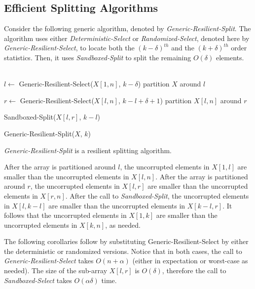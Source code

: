 \documentclass{llncs}
\begin{document}
\subsection{Efficient Splitting Algorithms}
\label{generic_splitting_algorithms}

Consider the following generic algorithm, denoted by \emph{Generic-Resilient-Split}. The algorithm uses either \emph{Deterministic-Select} or \emph{Randomized-Select}, denoted here by \emph{Generic-Resilient-Select}, to locate both the $(k-\delta)^{th}$ and the $(k+\delta)^{th}$ order statistics. Then, it uses \emph{Sandboxed-Split} to split the remaining $O(\delta)$ elements.\\ \ \\

\begin{algorithm}[H]

$l \leftarrow$ Generic-Resilient-Select($X[1, n]$, $k - \delta$)\;
partition $X$ around $l$\;

$r \leftarrow$ Generic-Resilient-Select($X[l, n]$, $k - l + \delta + 1$)\;
partition $X[l, n]$ around $r$\;

Sandboxed-Split($X[l, r]$, $k - l$)\;

\caption{Generic-Resilient-Split($X$, $k$)}
\end{algorithm}
\vspace{0.4cm}

\begin{lemma}
\label{lem:generic_resilient_split_lemma}
\emph{Generic-Resilient-Split} is a resilient splitting algorithm.
\end{lemma}

\begin{pf}
After the array is partitioned around $l$, the uncorrupted elements in $X[1, l]$ are smaller than the uncorrupted elements in $X[l, n]$. After the array is partitioned around $r$, the uncorrupted elements in $X[l, r]$ are smaller than the uncorrupted elements in $X[r, n]$. After the call to \emph{Sandboxed-Split}, the uncorrupted elements in $X[l, k-l]$ are smaller than the uncorrupted elements in $X[k-l, r]$. It follows that the uncorrupted elements in $X[1, k]$ are smaller than the uncorrupted elements in $X[k, n]$, as needed.~\end{pf}




The following corollaries follow by substituting Generic-Resilient-Select by either the deterministic or randomized versions. Notice that in both cases, the call to \emph{Generic-Resilient-Select} takes $O(n + \alpha)$ (either in expectation or worst-case as needed). The size of the sub-array $X[l, r]$ is $O(\delta)$, therefore the call to \emph{Sandboxed-Select} takes $O(\alpha\delta)$ time.
\end{document}
